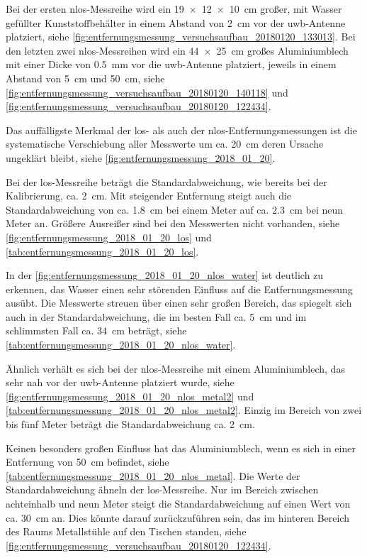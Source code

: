 Bei der ersten \Gls{nlos}-Messreihe wird ein \SI{19x12x10}{\centi\meter} großer, mit Wasser gefüllter Kunststoffbehälter in einem Abstand von \SI{2}{\centi\meter} vor der \Gls{uwb}-Antenne platziert, siehe \autoref{fig:entfernungsmessung_versuchsaufbau_20180120_133013}. Bei den letzten zwei \Gls{nlos}-Messreihen wird ein \SI{44x25}{\centi\meter} großes Aluminiumblech mit einer Dicke von \SI{0.5}{\milli\meter} vor die \Gls{uwb}-Antenne platziert, jeweils in einem Abstand von \SI{5}{\centi\meter} und \SI{50}{\centi\meter}, siehe \autoref{fig:entfernungsmessung_versuchsaufbau_20180120_140118} und \autoref{fig:entfernungsmessung_versuchsaufbau_20180120_122434}.


Das auffälligste Merkmal der \Gls{los}- als auch der \Gls{nlos}-Entfernungsmessungen ist die systematische Verschiebung aller Messwerte um ca. \SI{20}{\centi\meter} deren Ursache ungeklärt bleibt, siehe \autoref{fig:entfernungsmessung_2018_01_20}.

Bei der \Gls{los}-Messreihe beträgt die Standardabweichung, wie bereits bei der Kalibrierung, ca. \SI{2}{\centi\meter}. Mit steigender Entfernung steigt auch die Standardabweichung von ca. \SI{1.8}{\centi\meter} bei einem Meter auf ca. \SI{2.3}{\centi\meter} bei neun Meter an. Größere Ausreißer sind bei den Messwerten nicht vorhanden, siehe \autoref{fig:entfernungsmessung_2018_01_20_los} und \autoref{tab:entfernungsmessung_2018_01_20_los}.

In der \autoref{fig:entfernungsmessung_2018_01_20_nlos_water} ist deutlich zu erkennen, das Wasser einen sehr störenden Einfluss auf die Entfernungsmessung ausübt. Die Messwerte streuen über einen sehr großen Bereich, das spiegelt sich auch in der Standardabweichung, die im besten Fall ca. \SI{5}{\centi\meter} und im schlimmsten Fall ca. \SI{34}{\centi\meter} beträgt, siehe \autoref{tab:entfernungsmessung_2018_01_20_nlos_water}.

Ähnlich verhält es sich bei der \Gls{nlos}-Messreihe mit einem Aluminiumblech, das sehr nah vor der \Gls{uwb}-Antenne platziert wurde, siehe \autoref{fig:entfernungsmessung_2018_01_20_nlos_metal2} und \autoref{tab:entfernungsmessung_2018_01_20_nlos_metal2}. Einzig im Bereich von zwei bis fünf Meter beträgt die Standardabweichung ca. \SI{2}{\centi\meter}.

Keinen besonders großen Einfluss hat das Aluminiumblech, wenn es sich in einer Entfernung von \SI{50}{\centi\meter} befindet, siehe \autoref{tab:entfernungsmessung_2018_01_20_nlos_metal}. Die Werte der Standardabweichung ähneln der \Gls{los}-Messreihe. Nur im Bereich zwischen achteinhalb und neun Meter steigt die Standardabweichung auf einen Wert von ca. \SI{30}{\centi\meter} an. Dies könnte darauf zurückzuführen sein, das im hinteren Bereich des Raums Metallstühle auf den Tischen standen, siehe \autoref{fig:entfernungsmessung_versuchsaufbau_20180120_122434}.


